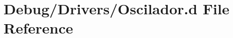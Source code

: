 \hypertarget{_oscilador_8d}{}\section{Debug/\+Drivers/\+Oscilador.d File Reference}
\label{_oscilador_8d}
